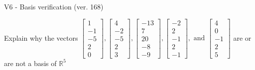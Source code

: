 \begin{exercise}
  \begin{exerciseTitle}V6 - Basis verification (ver. 168)\end{exerciseTitle}
  \begin{exerciseStatement}
    Explain why the vectors \(\left[\begin{array}{r}
1 \\
-1 \\
-5 \\
2 \\
0
\end{array}\right] , \left[\begin{array}{r}
4 \\
-2 \\
-5 \\
2 \\
3
\end{array}\right] , \left[\begin{array}{r}
-13 \\
7 \\
20 \\
-8 \\
-9
\end{array}\right] , \left[\begin{array}{r}
-2 \\
2 \\
-1 \\
2 \\
-1
\end{array}\right] , \text{ and } \left[\begin{array}{r}
4 \\
0 \\
-1 \\
2 \\
5
\end{array}\right]\) are or are not a basis of \(\mathbb{R}^5\)	



\end{exerciseStatement}
\end{exercise}

